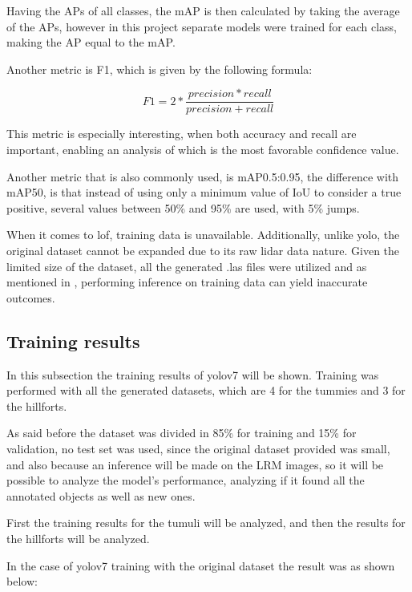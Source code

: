 Having the APs of all classes, the mAP is then calculated by taking the average of the APs, however in this project separate models were trained for each class, making the AP equal to the mAP.

Another metric is F1, which is given by the following formula:

\begin{equation}
     F1 = 2 * \frac{precision * recall}{precision + recall}
\end{equation}

This metric is especially interesting, when both accuracy and recall are important, enabling an analysis of which is the most favorable confidence value.

Another metric that is also commonly used, is mAP0.5:0.95, the difference with mAP50, is that instead of using only a minimum value of IoU to consider a true positive, several values between 50\% and 95\% are used, with 5\% jumps.

When it comes to lof, training data is unavailable. Additionally, unlike yolo, the original dataset cannot be expanded due to its raw lidar data nature. Given the limited size of the dataset, all the generated .las files were utilized and as mentioned in \cite{lof}, performing inference on training data can yield inaccurate outcomes.

\subsection{Training results}
In this subsection the training results of yolov7 will be shown. Training was performed with all the generated datasets, which are 4 for the tummies and 3 for the hillforts.

As said before the dataset was divided in 85\% for training and 15\% for validation, no test set was used, since the original dataset provided was small, and also because an inference will be made on the LRM images, so it will be possible to analyze the model's performance, analyzing if it found all the annotated objects as well as new ones.

First the training results for the tumuli will be analyzed, and then the results for the hillforts will be analyzed.

In the case of yolov7 training with the original dataset the result was as shown below:

